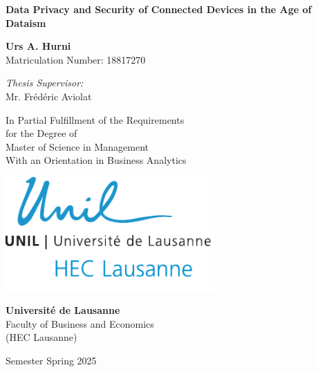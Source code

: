 \begin{titlepage}
    \centering
    \vspace{1cm}
    
    \textbf{\LARGE Data Privacy and Security of Connected Devices in the Age of Dataism}
    
    \vspace{1.5cm}
    
    \textbf{Urs A. Hurni} \\
    Matriculation Number: 18817270
    
    \vspace{0.5cm}
    
    \textit{Thesis Supervisor:} \\
    Mr. Frédéric Aviolat
    
    \vfill
    
    In Partial Fulfillment of the Requirements\\
    for the Degree of \\
    Master of Science in Management \\
    With an Orientation in Business Analytics
    
    \vfill
    
    \begin{minipage}{0.45\textwidth}
        \centering
        \includegraphics[width=0.6\textwidth]{figures/logo/lo_unil_hec06_bleu.pdf}
    \end{minipage}%
    \hfill
    
    \vspace{0.5cm}
    
    \textbf{Université de Lausanne}\\
    Faculty of Business and Economics\\
    (HEC Lausanne)
    \vspace{1cm}
    
    Semester Spring 2025

\end{titlepage}
